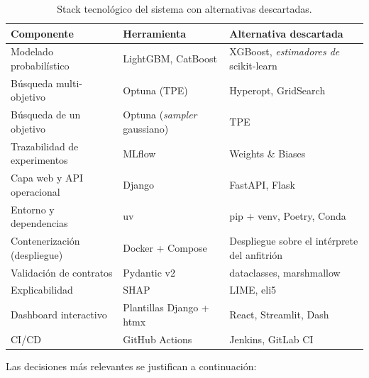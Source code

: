 \begin{table}[htbp]
    \centering
    \small
    \begin{tabular}{@{}>{\raggedright\arraybackslash}p{4.1cm}>{\raggedright\arraybackslash}p{4.0cm}>{\raggedright\arraybackslash}p{5.0cm}@{}}
        \toprule
        \textbf{Componente} & \textbf{Herramienta} & \textbf{Alternativa descartada} \\
        \midrule
        Modelado probabilístico & LightGBM, CatBoost & XGBoost, \textit{estimadores de} scikit-learn \\
        Búsqueda multi-objetivo & Optuna (TPE) & Hyperopt, GridSearch \\
        Búsqueda de un objetivo & Optuna (\textit{sampler} gaussiano) & TPE \\
        Trazabilidad de experimentos & MLflow & Weights \& Biases \\
        Capa web y API operacional & Django & FastAPI, Flask \\
        Entorno y dependencias & uv & pip + venv, Poetry, Conda \\
        Contenerización (despliegue) & Docker + Compose & Despliegue sobre el intérprete del anfitrión \\
        Validación de contratos & Pydantic v2 & dataclasses, marshmallow \\
        Explicabilidad & SHAP & LIME, eli5 \\
        Dashboard interactivo & Plantillas Django + htmx & React, Streamlit, Dash \\
        CI/CD & GitHub Actions & Jenkins, GitLab CI \\
        \bottomrule
    \end{tabular}
    \caption{Stack tecnológico del sistema con alternativas descartadas.}
    \label{tab:tech_stack}
\end{table}

Las decisiones más relevantes se justifican a continuación:

